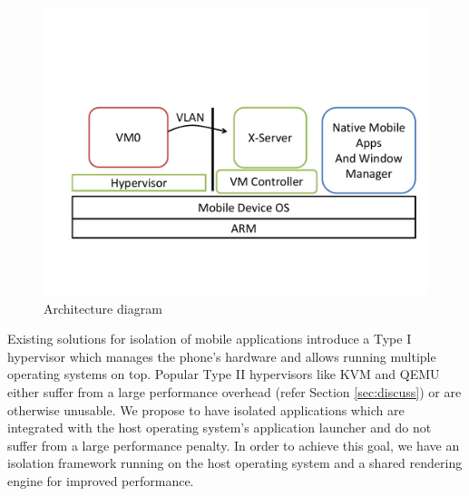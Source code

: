\begin{figure}[bth]
\centering
\includegraphics[width=1.5\columnwidth]{arch}
\caption{Architecture diagram}
\label{fig:arch}
\end{figure}
Existing solutions for isolation of mobile applications introduce a Type I hypervisor \cite{mvp, okl4} which manages the phone's hardware and allows running multiple operating systems on top. Popular Type II hypervisors like KVM and QEMU either suffer from a large performance overhead (refer Section \ref{sec:discuss}) or are otherwise unusable. We propose to have isolated applications which are integrated with the host operating system's application launcher and do not suffer from a large performance penalty. In order to achieve this goal, we have an isolation framework running on the host operating system and a shared rendering engine for improved performance. 


